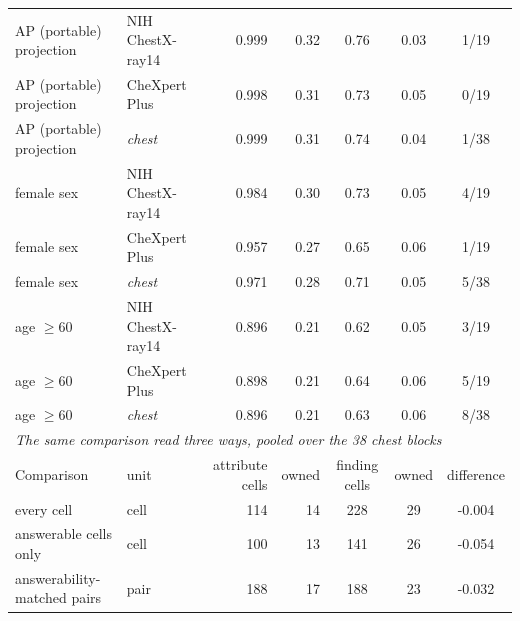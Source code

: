 \begin{table}[tp]
{\begin{tabular}{llrrccc}
\midrule
AP (portable) projection & NIH ChestX-ray14 & 0.999 & 0.32 & 0.76 & 0.03 & 1/19 \\
AP (portable) projection & CheXpert Plus & 0.998 & 0.31 & 0.73 & 0.05 & 0/19 \\
AP (portable) projection & \textit{chest} & 0.999 & 0.31 & 0.74 & 0.04 & 1/38 \\
female sex & NIH ChestX-ray14 & 0.984 & 0.30 & 0.73 & 0.05 & 4/19 \\
female sex & CheXpert Plus & 0.957 & 0.27 & 0.65 & 0.06 & 1/19 \\
female sex & \textit{chest} & 0.971 & 0.28 & 0.71 & 0.05 & 5/38 \\
age $\geq60$ & NIH ChestX-ray14 & 0.896 & 0.21 & 0.62 & 0.05 & 3/19 \\
age $\geq60$ & CheXpert Plus & 0.898 & 0.21 & 0.64 & 0.06 & 5/19 \\
age $\geq60$ & \textit{chest} & 0.896 & 0.21 & 0.63 & 0.06 & 8/38 \\
\midrule
\multicolumn{7}{l}{\textit{The same comparison read three ways, pooled over the 38 chest blocks}} \\
Comparison & unit & attribute cells & owned & finding cells & owned & difference \\
\midrule
every cell & cell & 114 & 14 & 228 & 29 & -0.004 \\
answerable cells only & cell & 100 & 13 & 141 & 26 & -0.054 \\
answerability-matched pairs & pair & 188 & 17 & 188 & 23 & -0.032 \\
\bottomrule
\end{tabular}}
\end{table}
